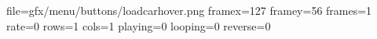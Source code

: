 file=gfx/menu/buttons/loadcarhover.png
framex=127
framey=56
frames=1
rate=0
rows=1
cols=1
playing=0
looping=0
reverse=0